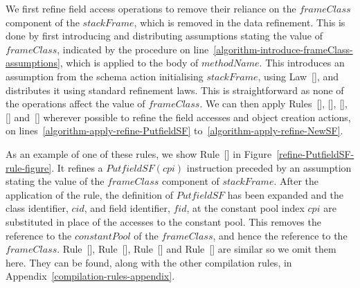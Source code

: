 We first refine field access operations to remove their reliance on
the $frameClass$ component of the $stackFrame$, which is removed in
the data refinement.
This is done by first introducing and distributing assumptions stating
the value of $frameClass$, indicated by the procedure
 on
line~\ref{algorithm-introduce-frameClass-assumptions}, which is
applied to the body of $methodName$.
This introduces an assumption from the schema action initialising
$stackFrame$, using Law~[], and
distributes it using standard refinement laws.
This is straightforward as none of the operations affect the value of
$frameClass$.
We can then apply Rules~[],
[],
[],
[] and~[]
wherever possible to refine the field accesses and object creation
actions, on lines~\ref{algorithm-apply-refine-PutfieldSF}
to~\ref{algorithm-apply-refine-NewSF}.

As an example of one of these rules, we show
Rule~[] in
Figure~\ref{refine-PutfieldSF-rule-figure}.
It refines a $PutfieldSF(cpi)$ instruction preceded by an assumption
stating the value of the $frameClass$ component of $stackFrame$.
After the application of the rule, the definition of $PutfieldSF$ has
been expanded and the class identifier, $cid$, and field identifier,
$fid$, at the constant pool index $cpi$ are substituted in place of
the accesses to the constant pool.
This removes the reference to the $constantPool$ of the $frameClass$,
and hence the reference to the $frameClass$.
Rule~[],
Rule~[],
Rule~[] and
Rule~[] are similar so we omit them here.
They can be found, along with the other compilation rules, in
Appendix~\ref{compilation-rules-appendix}.

